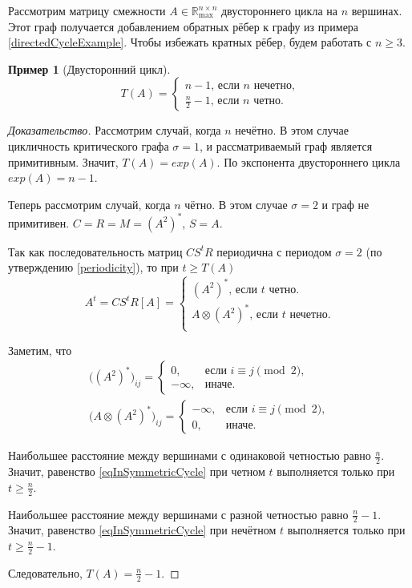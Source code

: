 \documentclass[12pt]{article}
\newtheorem{example}[theorem]{Пример}
\theoremstyle{definition}
\begin{document}
Рассмотрим матрицу смежности $A \in \mathbb{R}_{\max}^{n \times n}$ двустороннего цикла на $n$ вершинах. Этот граф получается добавлением обратных рёбер к графу из примера \ref{directedCycleExample}. Чтобы избежать кратных рёбер, будем работать с $n \ge 3$.

\begin{example}[Двусторонний цикл]
\begin{equation*}
T(A) = \begin{cases}
n - 1 \text{, если } n \text{ нечетно,}\\
\frac{n}{2} - 1 \text{, если } n \text{ четно.}
\end{cases}
\end{equation*}
\end{example}

\begin{proof}[Доказательство]
Рассмотрим случай, когда $n$ нечётно. В этом случае цикличность критического графа $\sigma = 1$, и рассматриваемый граф является примитивным. Значит, $T(A) = exp(A)$. По \cite[теорема 3.1]{kLocalExponent} экспонента двустороннего цикла $exp(A) = n - 1$.

Теперь рассмотрим случай, когда $n$ чётно. В этом случае $\sigma = 2$ и граф не примитивен. $C = R = M = (A^2)^*$, $S = A$.

Так как последовательность матриц $CS^tR$ периодична с периодом $\sigma = 2$ (по утверждению \ref{periodicity}), то при $t \ge T(A)$ \begin{equation}
\label{eqInSymmetricCycle}
A^t = CS^tR[A] = \begin{cases}
(A^2)^* \text{, если } t \text{ четно.}\\
A \otimes (A^2)^*\text{, если } t \text{ нечетно.}\\
\end{cases}
\end{equation}

Заметим, что \begin{align*}
\big((A^2)^* \big)_{ij} = \begin{cases}
0, & \text{если } i \equiv j \pmod{2},  \\
-\infty, & \text{иначе.}
\end{cases} \\
\big(A \otimes (A^2)^* \big)_{ij} = \begin{cases}
-\infty, & \text{если } i \equiv j \pmod{2},  \\
0, & \text{иначе.}
\end{cases}
\end{align*}


Наибольшее расстояние между вершинами с одинаковой четностью равно $\frac{n}{2}$. Значит, равенство \ref{eqInSymmetricCycle} при четном $t$ выполняется только при $t \ge \frac{n}{2}$.

Наибольшее расстояние между вершинами с разной четностью равно $\frac{n}{2} - 1$. Значит, равенство \ref{eqInSymmetricCycle} при нечётном $t$ выполняется только при $t \ge \frac{n}{2} - 1$.

Следовательно, $T(A) = \frac{n}{2} - 1$.
\end{proof}
\end{document}
